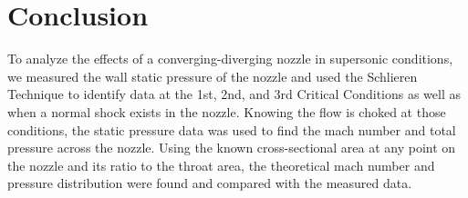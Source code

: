 \chapter{Conclusion}
\label{cp:conclusion}
To analyze the effects of a converging-diverging nozzle in supersonic conditions, we measured the wall static pressure of the nozzle and used the Schlieren Technique to identify data at the 1st, 2nd, and 3rd Critical Conditions as well as when a normal shock exists in the nozzle. Knowing the flow is choked at those conditions, the static pressure data was used to find the mach number and total pressure across the nozzle. Using the known cross-sectional area at any point on the nozzle and its ratio to the throat area, the theoretical mach number and pressure distribution were found and compared with the measured data.